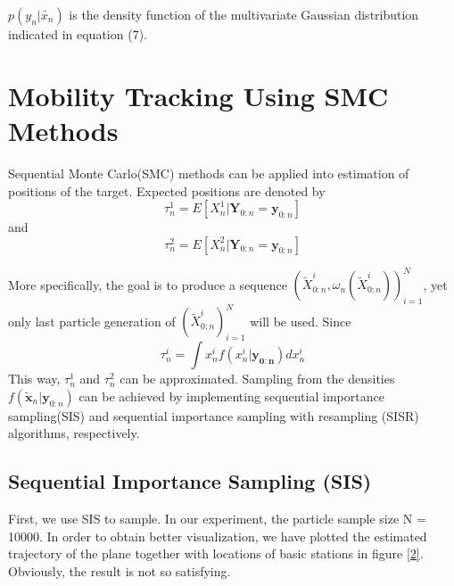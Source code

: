 \documentclass{article}
\begin{document}
$p(y_n|\tilde{x_n})$ is the density function of the multivariate Gaussian distribution indicated in equation (7).

\section{Mobility Tracking Using SMC Methods} 

Sequential Monte Carlo(SMC) methods can be applied into estimation of positions of the target. Expected positions are denoted by 
\begin{equation}
    \tau_n^1=E[X_n^1|\boldsymbol{Y}_{0:n}=\boldsymbol{y}_{0:n}]
\end{equation}
and \begin{equation}
    \tau_n^2=E[X_n^2|\boldsymbol{Y}_{0:n}=\boldsymbol{y}_{0:n}]
\end{equation}

More specifically, the goal is to produce a sequence $(\tilde{X}_{0:n}^i,\omega_n(\tilde{X}_{0:n}^i))_{i=1}^N$, yet only last particle generation of  $(\tilde{X}_{0:n}^i)_{i=1}^N$ will be used. Since 
\begin{equation}
    \tau_n^i=\int x_n^if(x_n^i| \boldsymbol{y_{0:n}})dx_n^i
\end{equation}
This way, $\tau_n^1$ and $\tau_n^2$ can be approximated.
Sampling from the densities $f(\boldsymbol{\tilde{x}}_n|\boldsymbol{y}_{0:n})$ can be achieved by implementing sequential importance sampling(SIS) and sequential importance sampling with resampling (SISR) algorithms, respectively. 

\subsection{Sequential Importance Sampling (SIS)}
First, we use SIS to sample. In our experiment, the particle sample size N = 10000. In order to obtain better visualization, we have plotted the estimated trajectory of the plane together with locations of basic stations in figure \ref{2}. Obviously, the result is not so satisfying.
\end{document}
